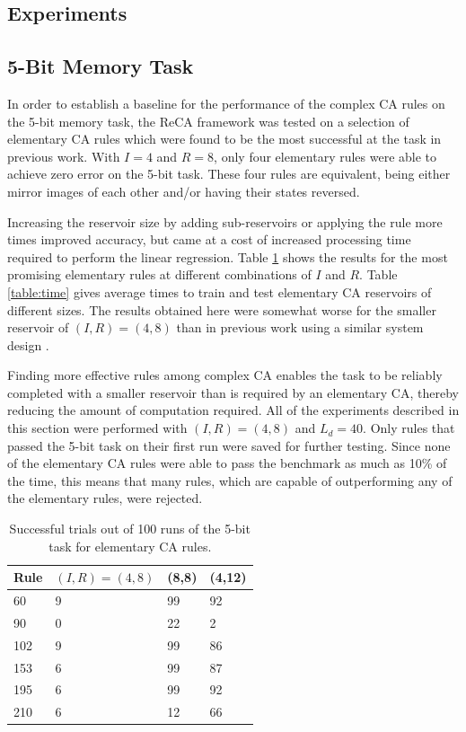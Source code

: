 \documentclass{elsarticle}
\begin{document}
\begin{multicols}{2}
    \section{Experiments}\label{experiment}
\subsection{5-Bit Memory Task}
In order to establish a baseline for the performance of the complex CA rules on 
    the 5-bit memory task, the ReCA framework was tested on a selection of 
    elementary CA rules which were found to be the most successful at the task 
    in previous work\cite{yilmaz2014reservoir}\cite{bye2016investigation}. With 
    $I = 4$ and $R = 8$, only four elementary rules were able to achieve zero 
    error on the 5-bit task. These four rules are equivalent, being either 
    mirror images of each other and/or having their states reversed.\par 
    Increasing the reservoir size by adding sub-reservoirs or applying the rule 
    more times improved accuracy, but came at a cost of increased processing 
    time required to perform the linear regression.  Table 
    \ref{table:elementary} shows the results for the most promising elementary 
    rules at different combinations of $I$ and $R$.  Table \ref{table:time} 
gives average times to train and test elementary CA reservoirs of different 
   sizes. The results obtained here were somewhat worse for the smaller 
   reservoir of $(I,R) = (4,8)$ than in previous work using a similar system 
   design  
   \cite{yilmaz2014reservoir}\cite{bye2016investigation}\cite{nichele2017reservoir}.  
   \par Finding more effective rules among complex CA enables the task to be 
   reliably completed with a smaller reservoir than is required by an 
   elementary CA, thereby reducing the amount of computation required. All of 
   the experiments described in this section were performed with $(I,R) = 
   (4,8)$ and $L_{d} = 40$.  Only rules that passed the 5-bit task on their 
   first run were saved for further testing.  Since none of the elementary CA 
   rules were able to pass the benchmark as much as 10\% of the time, this 
   means that many rules, which are capable of outperforming any of the 
   elementary rules, were rejected. 


\begin{table}[H] \centering
\begin{tabular}{|l|l|l|l|}
\hline
\textbf{Rule} & \boldmath$(I,R)=(4,8)$ & \textbf{(8,8)} & \textbf{(4,12)} \\ 
\hline
60 & 9 & 99 & 92 \\ \hline
90 & 0 & 22 & 2  \\ \hline
102 & 9 & 99 & 86 \\ \hline
153 & 6 & 99 & 87 \\ \hline
195 & 6 & 99 & 92 \\ \hline
210 & 6 & 12 & 66 \\ \hline
\end{tabular}
\caption{Successful trials out of 100 runs of the 5-bit task for elementary CA 
   rules.}
\label{table:elementary}
\end{table}


\end{multicols}
\end{document}
